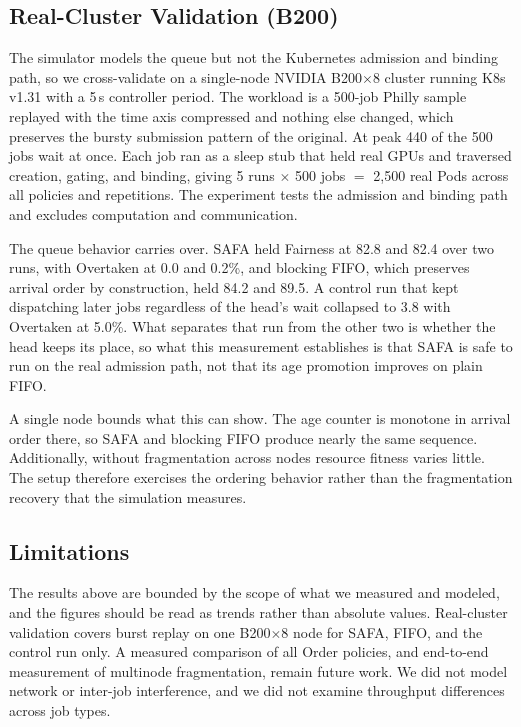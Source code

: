\documentclass{ieeetj}
\begin{document}
\subsection{Real-Cluster Validation (B200)}\label{eval:b200}
The simulator models the queue but not the Kubernetes admission and binding path, so we cross-validate on a single-node NVIDIA B200$\times$8 cluster running K8s v1.31 with a 5\,s controller period. The workload is a 500-job Philly sample replayed with the time axis compressed and nothing else changed, which preserves the bursty submission pattern of the original. At peak 440 of the 500 jobs wait at once. Each job ran as a sleep stub that held real GPUs and traversed creation, gating, and binding, giving 5 runs $\times$ 500 jobs $=$ 2{,}500 real Pods across all policies and repetitions. The experiment tests the admission and binding path and excludes computation and communication.

The queue behavior carries over. SAFA held Fairness at 82.8 and 82.4 over two runs, with Overtaken at 0.0 and 0.2\%, and blocking FIFO, which preserves arrival order by construction, held 84.2 and 89.5. A control run that kept dispatching later jobs regardless of the head's wait collapsed to 3.8 with Overtaken at 5.0\%. What separates that run from the other two is whether the head keeps its place, so what this measurement establishes is that SAFA is safe to run on the real admission path, not that its age promotion improves on plain FIFO.

A single node bounds what this can show. The age counter is monotone in arrival order there, so SAFA and blocking FIFO produce nearly the same sequence. Additionally, without fragmentation across nodes resource fitness varies little. The setup therefore exercises the ordering behavior rather than the fragmentation recovery that the simulation measures.

\subsection{Limitations}\label{eval:threats}
The results above are bounded by the scope of what we measured and modeled, and the figures should be read as trends rather than absolute values. Real-cluster validation covers burst replay on one B200$\times$8 node for SAFA, FIFO, and the control run only. A measured comparison of all Order policies, and end-to-end measurement of multinode fragmentation, remain future work. We did not model network or inter-job interference, and we did not examine throughput differences across job types.
\end{document}
